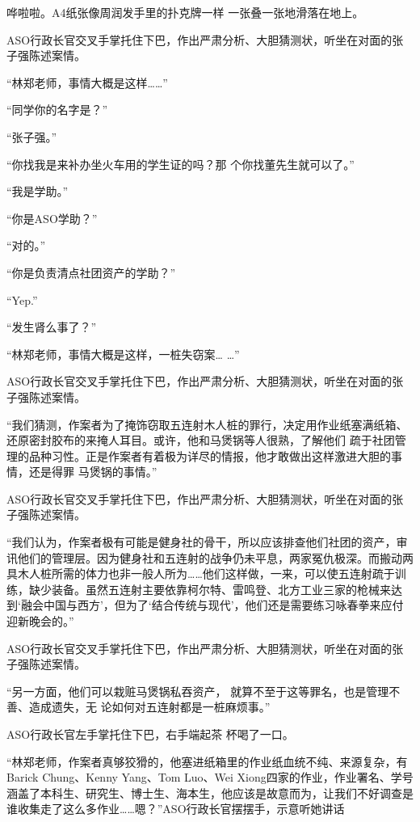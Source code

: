 \documentclass{article}
\begin{document}
哗啦啦。A4纸张像周润发手里的扑克牌一样
一张叠一张地滑落在地上。 

ASO行政长官交叉手掌托住下巴，作出严肃分析、大胆猜测状，听坐在对面的张子强陈述案情。
 


“林郑老师，事情大概是这样……” 


“同学你的名字是？” 


“张子强。” 

“你找我是来补办坐火车用的学生证的吗？那
个你找董先生就可以了。” 

\newpage


“我是学助。” 


“你是ASO学助？” 


“对的。” 


“你是负责清点社团资产的学助？” 


“Yep.” 


“发生肾么事了？” 

“林郑老师，事情大概是这样，一桩失窃案…
…” 

ASO行政长官交叉手掌托住下巴，作出严肃分析、大胆猜测状，听坐在对面的张子强陈述案情。

“我们猜测，作案者为了掩饰窃取五连射木人桩的罪行，决定用作业纸塞满纸箱、还原密封胶布的来掩人耳目。或许，他和马煲锅等人很熟，了解他们
\newpage
疏于社团管理的品种习性。正是作案者有着极为详尽的情报，他才敢做出这样激进大胆的事情，还是得罪
马煲锅的事情。” 

ASO行政长官交叉手掌托住下巴，作出严肃分析、大胆猜测状，听坐在对面的张子强陈述案情。

“我们认为，作案者极有可能是健身社的骨干，所以应该排查他们社团的资产，审讯他们的管理层。因为健身社和五连射的战争仍未平息，两家冤仇极深。而搬动两具木人桩所需的体力也非一般人所为……他们这样做，一来，可以使五连射疏于训练，缺少装备。虽然五连射主要依靠柯尔特、雷鸣登、北方工业三家的枪械来达到‘融会中国与西方’，但为了‘结合传统与现代’，他们还是需要练习咏春拳来应付
迎新晚会的。” 

ASO行政长官交叉手掌托住下巴，作出严肃分析、大胆猜测状，听坐在对面的张子强陈述案情。

“另一方面，他们可以栽赃马煲锅私吞资产，
\newpage
就算不至于这等罪名，也是管理不善、造成遗失，无
论如何对五连射都是一桩麻烦事。” 

ASO行政长官左手掌托住下巴，右手端起茶
杯喝了一口。 

“林郑老师，作案者真够狡猾的，他塞进纸箱里的作业纸血统不纯、来源复杂，有Barick Chung、Kenny Yang、Tom Luo、Wei Xiong四家的作业，作业署名、学号涵盖了本科生、研究生、博士生、海本生，他应该是故意而为，让我们不好调查是谁收集走了这么多作业……嗯？”ASO行政长官摆摆手，示意听她讲话
\end{document}
